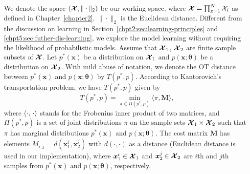 We denote the space $(\bm{\mathcal{X}},\|\cdot\|_2)$ be our working space, where $\bm{\mathcal{X}} = \prod_{x=1}^{N} \mathcal{X}_i$ as defined in Chapter~\ref{chapter2}. $\|\cdot\|_2$ is the Euclidean distance. Different from the discussion on learning in Section~\ref{chpt2:sec:learning-principles} and \ref{chpt5:sec:futher-dis-learning}, we explore the model learning without requiring the likelihood of probabilistic models.
 Assume that $\bm{\mathcal{X}}_1$, $\bm{\mathcal{X}}_2$ are finite sample subsets of $\bm{\mathcal{X}}$. Let $p^{\ast}(\bm{x})$ be a distribution on $\bm{\mathcal{X}}_1$ and $p(\bm{x};\bm{\theta})$ be a distribution on $\bm{\mathcal{X}}_2$.
With mild abuse of notation, we denote the OT distance between $p^{\ast}(\bm{x})$ and $p(\bm{x}; \bm{\theta})$ by $T(p^{\ast},p)$. According to Kantorovich's transportation problem\cite{villani2003topics}, we have $T(p^{\ast},p)$ given by
\begin{equation}\label{chpt8:eq:ot}
  T(p^{\ast}, p) = \min_{\pi\in\Pi(p^{\ast}, p)}\langle\pi,\bm{M}\rangle,
\end{equation}
where $\langle \cdot,\,\cdot\rangle$ stands for the Frobenius inner product of
two matrices, and $\Pi(p^{\ast},p)$ is a set of joint distributions $\pi$ on
the sample sets $\bm{\mathcal{X}}_1\times\bm{\mathcal{X}}_2$ such that $\pi$ has
marginal distributions $p^{\ast}(\bm{x})$ and $p(\bm{x}; \bm{\theta})$. 
The cost matrix $\bm{M}$ has elements $M_{i,j} = d(\bm{x}_1^{i}, \bm{x}_2^{j})$ with $d(\cdot, \cdot)$ as a distance (Euclidean distance is used in our implementation), where $\bm{x}_1^{i}\in\bm{\mathcal{X}}_1$ and $\bm{x}_2^{j}\in \bm{\mathcal{X}}_2$ are $i$th and $j$th samples from $p^{\ast}(\bm{x})$ and $p(\bm{x}; \bm{\theta})$, respectively. 


